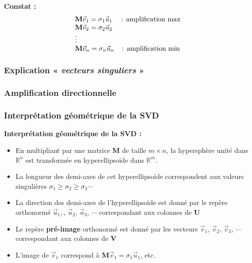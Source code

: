 \documentclass[document.tex]{subfiles}
\begin{document}
\textbf{Constat : }
$$
\begin{array}{l c}
\textbf{M} \vec{v}_1 = \sigma_1 \vec{u}_1 & \text{: amplification max} \\
\textbf{M} \vec{v}_2 = \sigma_2 \vec{u}_2 & \\
\vdots \\
\textbf{M} \vec{v}_n = \sigma_n \vec{u}_n & \text{: amplification min} \\
\end{array}
$$

\subsubsection{Explication « \textit{vecteurs singuliers} »}


\subsubsection{Amplification directionnelle}



\subsubsection{Interprétation géométrique de la SVD}


\textbf{Interprétation géométrique de la SVD :}\\

\begin{itemize}
\item En multipliant par une matrice \textbf{M} de taille $m \times n$, la hypersphère unité dans $\mathbb{R}^n$ est transformée en hyperellipsoïde dans $\mathbb{R}^m$.
\item La longueur des demi-axes de cet hyperellipsoïde correspondent aux valeurs singulières $\sigma_1 \geq \sigma_2 \geq \sigma_3 \cdots$ 
\item La direction des demi-axes de l’hyperellipsoïde est donné par le repère orthonormé $\vec{u}_1,$, $\vec{u}_2$, $\vec{u}_3$, $\cdots$ correspondant aux colonnes de \textbf{U}
\item Le repère \textbf{pré-image} orthonormé est donné par les vecteurs $\vec{v}_1$, $\vec{v}_2$, $\vec{v}_3$, $\cdots$ correspondant aux colonnes de \textbf{V}
\item L'image de $\vec{v}_1$ correspond à $\textbf{M}\vec{v}_1 = \sigma
_1 \vec{u}_1$, etc.
\end{itemize}
\end{document}
